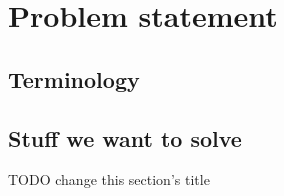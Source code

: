 
 \chapter{Problem statement}

  \section{Terminology}

  \section{Stuff we want to solve}

   TODO change this section's title

